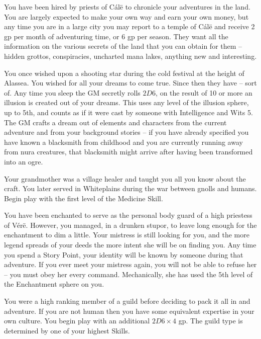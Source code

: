 \begin{multicols}{2}
\begin{list}{\addtocounter{list}{1}\textbf{:}}{\raggedleft}
\item{You have been hired by priests of C\'{a}l\"{e} to chronicle your adventures in the land.
You are largely expected to make your own way and earn your own money, but any time you are in a large city you may report to a temple of C\'{a}l\"{e} and receive 2 gp per month of adventuring time, or 6 gp per season.
They want all the information on the various secrets of the land that you can obtain for them -- hidden grottos, conspiracies, uncharted mana lakes, anything new and interesting.
}

\item{You once wished upon a shooting star during the cold festival at the height of Alassea.
You wished for all your dreams to come true.
Since then they have -- sort of.
Any time you sleep the GM secretly rolls $2D6$, on the result of 10 or more an illusion is created out of your dreams.
This uses any level of the illusion sphere, up to 5th, and counts as if it were cast by someone with Intelligence and Wits 5.
The GM crafts a dream out of elements and characters from the current adventure and from your background stories -- if you have already specified you have known a blacksmith from childhood and you are currently running away from nura creatures, that blacksmith might arrive after having been transformed into an ogre.
}

\item{Your grandmother was a village healer and taught you all you know about the craft.
You later served in Whiteplains during the war between gnolls and humans.
Begin play with the first level of the Medicine Skill.}

\item{You have been enchanted to serve as the personal body guard of a high priestess of V\'{e}r\"{e}.  However, you managed, in a drunken stupor, to leave long enough for the enchantment to dim a little.  Your mistress is still looking for you, and the more legend spreads of your deeds the more intent she will be on finding you.  Any time you spend a Story Point, your identity will be known by someone during that adventure.  If you ever meet your mistress again, you will not be able to refuse her -- you must obey her every command.  Mechanically, she has used the 5th level of the Enchantment sphere on you.}

\item{You were a high ranking member of a guild before deciding to pack it all in and adventure.  If you are not human then you have some equivalent expertise in your own culture.  You begin play with an additional $2D6\times4$ gp.  The guild type is determined by one of your highest Skills.}


\end{list}
\end{multicols}

